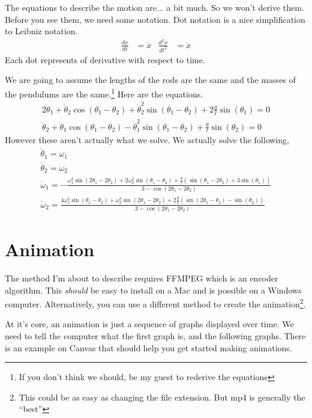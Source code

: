 \documentclass[11pt,letterpaper]{article}
\begin{document}
The equations to describe the motion are... a bit much. So we won't derive them. Before you
see them, we need some notation. Dot notation is a nice simplification to Leibniz notation.
\begin{align*}
 \frac{dx}{dt} &= \dot{x} & \frac{d^2x}{dt^2} &= \ddot{x}
\end{align*}
Each dot represents of derivative with respect to time.

We are going to assume the lengths of the rods are the same and the masses of the pendulums are
the same.\footnote{If you don't think we should, be my guest to rederive the equations} Here are
the equations.
\begin{gather*}
 2\ddot{\theta}_1 + \ddot{\theta}_2\cos(\theta_1-\theta_2)+\dot{\theta}_2^2\sin(\theta_1-\theta_2)+2\frac{g}{\ell}\sin(\theta_1)=0\\
\ddot{\theta}_2 + \ddot{\theta}_1\cos(\theta_1-\theta_2)-\dot{\theta}^2_1\sin(\theta_1-\theta_2)+\frac{g}{\ell}\sin(\theta_2)=0
\end{gather*}
However these aren't actually what we solve. We actually solve the following,
\begin{gather*}
\dot{\theta}_1 = \omega_1 \\
\dot{\theta}_2 = \omega_2 \\
\dot{\omega}_1 = -\frac{\omega_1^2\sin(2\theta_1-2\theta_2)+2\omega_2^2\sin(\theta_1-\theta_2)+\frac{g}{l}(\sin(\theta_1-2\theta_2)+3\sin(\theta_1))}{3-\cos(2\theta_1-2\theta_2)} \\
\dot{\omega}_2 = \frac{4\omega_1^2\sin(\theta_1-\theta_2)+\omega_2^2\sin(2\theta_1-2\theta_2)+2\frac{g}{l}(\sin(2\theta_1-\theta_2)-\sin(\theta_2))}{3-\cos(2\theta_1-2\theta_2)} 
\end{gather*}


\section{Animation}
The method I'm about to describe requires FFMPEG which is an encoder algorithm. This \emph{should}
be easy to install on a Mac and is possible on a Windows computer. Alternatively, you can use a different
method to create the animation\footnote{This could be as easy as changing the file extension. But
mp4 is generally the ``best''}.

At it's core, an animation is just a sequence of graphs displayed over time. We need to tell
the computer what the first graph is, and the following graphs. There is an example on Canvas
that should help you get started making animations. 
\end{document}
